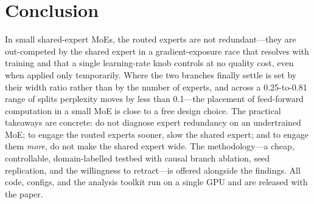 \documentclass[11pt]{article}
\begin{document}
\section{Conclusion}

In small shared-expert MoEs, the routed experts are not redundant---they are out-competed by the
shared expert in a gradient-exposure race that resolves with training and that a single learning-rate
knob controls at no quality cost, even when applied only temporarily. Where the two branches finally
settle is set by their width ratio rather than by the number of experts, and across a 0.25-to-0.81
range of splits perplexity moves by less than 0.1---the placement of feed-forward computation in a
small MoE is close to a free design choice. The practical takeaways are concrete: do not diagnose
expert redundancy on an undertrained MoE; to engage the routed experts sooner, slow the shared
expert; and to engage them \emph{more}, do not make the shared expert wide. The
methodology---a cheap, controllable, domain-labelled testbed with causal branch
ablation, seed replication, and the willingness to retract---is offered alongside the findings. All
code, configs, and the analysis toolkit run on a single GPU and are released with the paper.



\end{document}
